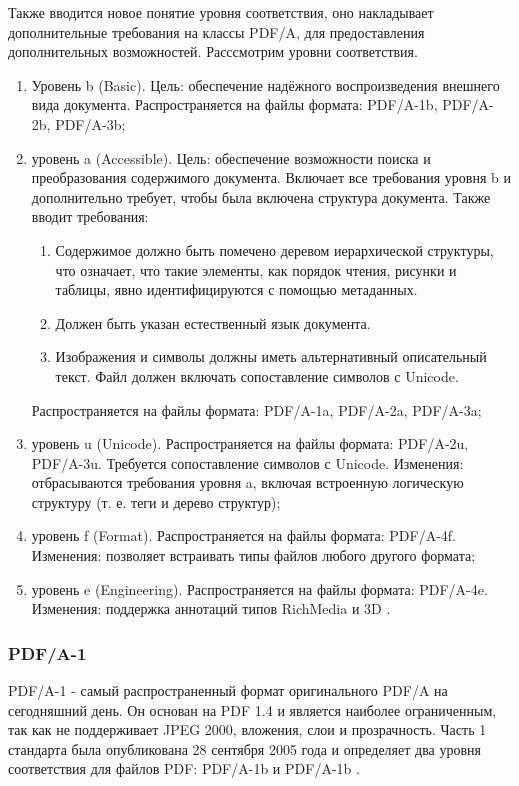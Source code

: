 Также вводится новое понятие уровня соответствия, оно накладывает дополнительные требования на классы PDF/A, для предоставления дополнительных возможностей.
Расссмотрим уровни соответствия.
\begin{enumerate}
	\item Уровень b (Basic).
	Цель: обеспечение надёжного воспроизведения внешнего вида документа.
	Распространяется на файлы формата: PDF/A-1b, PDF/A-2b, PDF/A-3b;
	\item уровень a (Accessible).
	Цель: обеспечение возможности поиска и преобразования содержимого документа.
	Включает все требования уровня b и дополнительно требует, чтобы была включена структура документа.
	Также вводит требования:
	\begin{enumerate}
		\item Содержимое должно быть помечено деревом иерархической структуры, что означает, что такие элементы, как порядок чтения, рисунки и таблицы, явно идентифицируются с помощью метаданных.
		\item Должен быть указан естественный язык документа.
		\item Изображения и символы должны иметь альтернативный описательный текст.
		Файл должен включать сопоставление символов с Unicode.
	\end{enumerate}
	Распространяется на файлы формата: PDF/A-1a, PDF/A-2a, PDF/A-3a;
	
	\item уровень u (Unicode).
	Распространяется на файлы формата: PDF/A-2u, PDF/A-3u.
	Требуется сопоставление символов с Unicode.
	Изменения:
	отбрасываются требования уровня a, включая встроенную логическую структуру (т. е. теги и дерево структур);
	
	\item уровень f (Format).
	Распространяется на файлы формата: PDF/A-4f.
	Изменения:
	позволяет встраивать типы файлов любого другого формата;
	
	\item уровень e (Engineering).
	Распространяется на файлы формата: PDF/A-4e.
	Изменения:
	поддержка аннотаций типов RichMedia и 3D \cite{pdf_levels_std}.
\end{enumerate}


\subsubsection{PDF/A-1}
PDF/A-1 - самый распространенный формат оригинального PDF/A на сегодняшний день. Он основан на PDF 1.4 и является наиболее ограниченным, так как не поддерживает JPEG 2000, вложения, слои и прозрачность. Часть 1 стандарта была опубликована 28 сентября 2005 года и определяет два уровня соответствия для файлов PDF: PDF/A-1b и PDF/A-1b \cite{pdf_a_2}.


